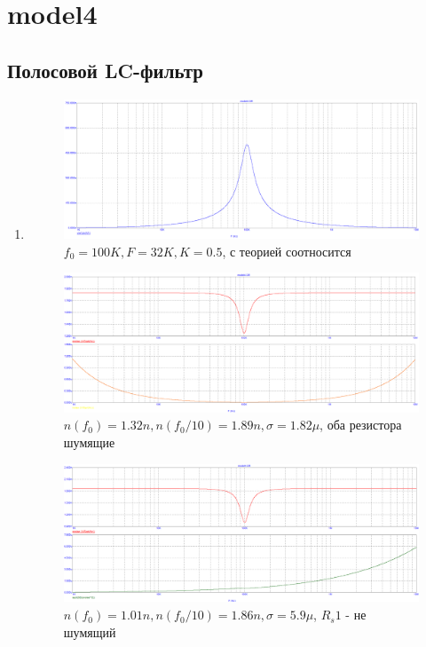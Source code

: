\documentclass[a4paper, 12pt]{article}%
\begin{document}
\section{\textbf{model4}}

\subsection*{Полосовой LC-фильтр}

\begin{enumerate}

\item

\FloatBarrier
\begin{figure}[h!]
    \centering
    \includegraphics[scale=0.3]{images/mod4_1_1.png}
    \caption{$f_0 = 100K, F = 32K, K = 0.5$, с теорией соотносится}
    \label{fig:m411}
\end{figure}

\begin{figure}[h!]
    \centering
    \includegraphics[scale=0.3]{images/mod4_1_2_1.png}
    \caption{$n(f_0) = 1.32n, n(f_0/10) = 1.89n, \sigma = 1.82\mu$, оба резистора шумящие}
    \label{fig:m4121}
\end{figure}

\begin{figure}[h!]
    \centering
    \includegraphics[scale=0.3]{images/mod4_1_2_2.png}
    \caption{$n(f_0) = 1.01n, n(f_0/10) = 1.86n, \sigma = 5.9 \mu$, $R_s1$ - не шумящий}
    \label{fig:m4122}
\end{figure}


\end{enumerate}
\end{document}

